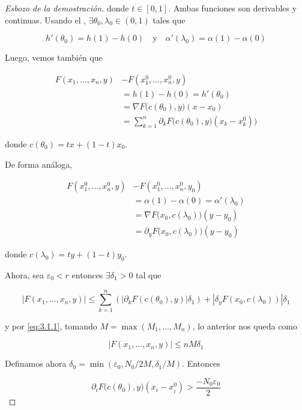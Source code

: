 \begin{proof}[Esbozo de la demostración]
    \noindent donde $t \in [0,1]$. Ambas funciones son derivables y continuas. Usando el \TVM, $\exists \theta_0, \lambda_0 \in (0,1)$ tales que
    
    \[
    h'(\theta_0) = h(1) - h(0) \quad \text{y} \quad \alpha'(\lambda_0) = \alpha(1) - \alpha(0)
    \]
    
    Luego, vemos también que
    
    \begin{align*}
        F(x_1, \dots, x_n, y) &- F(x_1^0, \dots, x_n^0, y) \\
             &= h(1) - h(0) = h'(\theta_0) \\
             &= \nabla F \big( c(\theta_0), y \big) (x-x_0) \\
             &= \sum_{k=1}^n \partial_k F\big( c(\theta_0), y \big) (x_k - x_k^0) \big)
    \end{align*}
    
    \noindent donde $c(\theta_0) = tx + (1-t)x_0$.
    
    De forma análoga,
    
    \begin{align*}
        F(x_1^0, \dots, x_n^0, y) &- F(x_1^0, \dots, x_n^0, y_0) \\
             &= \alpha(1) - \alpha(0) = \alpha'(\lambda_0) \\
             &= \nabla F \big( x_0, c(\lambda_0) \big) (y-y_0) \\
             &= \partial_y F\big( x_0, c(\lambda_0) \big) (y - y_0)
    \end{align*}
    
    \noindent donde $c(\lambda_0) = ty + (1-t)y_0$.
    
    Ahora, sea $\varepsilon_0 < r$ entonces $\exists \delta_1 > 0$ tal que
    
    \[
    \left| F(x_1, \dots, x_n, y) \right| \leq \sum_{k=1}^n \left( |\partial_k F\left( c(\theta_0), y \right)|\delta_1 \right) + \left|\delta_y F\left( x_0, c(\lambda_0) \right)\right|\delta_1
    \]
    
    \noindent y por \ref{eq:3.1.1}, tomando $M = \max(M_1, \dots, M_n)$, lo anterior nos queda como
    
    \[
    \left| F(x_1, \dots, x_n, y) \right| \leq nM\delta_1
    \]
    
    Definamos ahora $\delta_0 = \min(\varepsilon_0, N_0/2M, \delta_1/M)$. Entonces
    
    \[
    \partial_i F\big( c(\theta_0), y \big)(x_i - x_i^0) > \frac{-N_0 \varepsilon_0}{2}
    \]
    

\end{proof}
